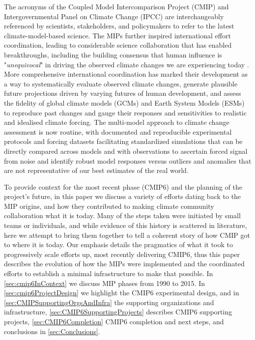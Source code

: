 \documentclass[gmd, preprint]{copernicus}
\begin{document}
The acronyms of the Coupled Model Intercomparison Project (CMIP) and Intergovernmental Panel on Climate Change (IPCC) are interchangeably referenced by scientists, stakeholders, and policymakers to refer to the latest climate-model-based science. The MIPs further inspired international effort coordination, leading to considerable science collaboration that has enabled breakthroughs, including the building consensus that human influence is "\textit{unequivocal}" in driving the observed climate changes we are experiencing today \citep{eyring_human_2021}. More comprehensive international coordination has marked their development as a way to systematically evaluate observed climate changes, generate plausible future projections driven by varying futures of human development, and assess the fidelity of global climate models (GCMs) and Earth System Models (ESMs) to reproduce past changes and gauge their responses and sensitivities to realistic and idealised climate forcing. The multi-model approach to climate change assessment is now routine, with documented and reproducible experimental protocols and forcing datasets facilitating standardized simulations that can be directly compared across models and with observations to ascertain forced signal from noise and identify robust model responses versus outliers and anomalies that are not representative of our best estimates of the real world.

To provide context for the most recent phase (CMIP6) and the planning of the project’s future, in this paper we discuss a variety of efforts dating back to the MIP origins, and how they contributed to making climate community collaboration what it is today. Many of the steps taken were initiated by small teams or individuals, and while evidence of this history is scattered in literature, here we attempt to bring them together to tell a coherent story of how CMIP got to where it is today. Our emphasis details the pragmatics of what it took to progressively scale efforts up, most recently delivering CMIP6, thus this paper describes the evolution of how the MIPs were implemented and the coordinated efforts to establish a minimal infrastructure to make that possible. In \autoref{sec:cmip6InContext} we discuss MIP phases from 1990 to 2015. In \autoref{sec:cmip6ProjectDesign} we highlight the CMIP6 experimental design, and in \autoref{sec:CMIPSupportingOrgsAndInfra} the supporting organizations and infrastructure, \autoref{sec:CMIP6SupportingProjects} describes CMIP6 supporting projects, \autoref{sec:CMIP6Completion} CMIP6 completion and next steps, and conclusions in \autoref{sec:Conclusions}.
\end{document}
